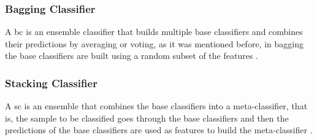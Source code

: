 \subsubsection{Bagging Classifier}
A \ac{bc} is an ensemble classifier that builds multiple base classifiers and combines their predictions by averaging or voting, as it was mentioned before, in bagging the base classifiers are built using a random subset of the features \cite{scikit_learn_bagging_nodate}.

\subsubsection{Stacking Classifier}
A \ac{sc} is an ensemble that combines the base classifiers into a meta-classifier, that is, the sample to be classified goes through the base classifiers and then the predictions of the base classifiers are used as features to build the meta-classifier \cite{wolpert_stacked_nodate}.